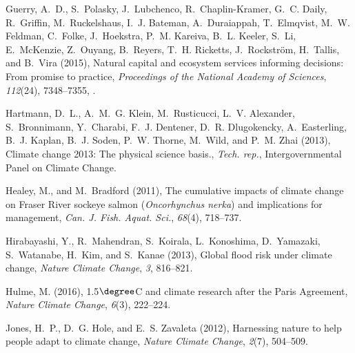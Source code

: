 \documentclass[9pt,twocolumn,twoside,lineno]{pnas-new}
\begin{document}
{{
Guerry, A.~D., S.~Polasky, J.~Lubchenco, R.~Chaplin-Kramer, G.~C. Daily,
  R.~Griffin, M.~Ruckelshaus, I.~J. Bateman, A.~Duraiappah, T.~Elmqvist, M.~W.
  Feldman, C.~Folke, J.~Hoekstra, P.~M. Kareiva, B.~L. Keeler, S.~Li,
  E.~McKenzie, Z.~Ouyang, B.~Reyers, T.~H. Ricketts, J.~Rockstr{\"o}m,
  H.~Tallis, and B.~Vira (2015), Natural capital and ecosystem services
  informing decisions: From promise to practice, \textit{Proceedings of the
  National Academy of Sciences}, \textit{112}(24), 7348--7355,
  .

Hartmann, D.~L., A.~M.~G. Klein, M.~Rusticucci, L.~V. Alexander, S.~Bronnimann,
  Y.~Charabi, F.~J. Dentener, D.~R. Dlugokencky, A.~Easterling, B.~J. Kaplan,
  B.~J. Soden, P.~W. Thorne, M.~Wild, and P.~M. Zhai (2013), Climate change
  2013: The physical science basis., \textit{Tech. rep.}, Intergovernmental
  Panel on Climate Change.

Healey, M., and M.~Bradford (2011), The cumulative impacts of climate change on
  {F}raser {R}iver sockeye salmon (\textit{{O}ncorhynchus nerka}) and
  implications for management, \textit{Can. J. Fish. Aquat. Sci.},
  \textit{68}(4), 718--737.

Hirabayashi, Y., R.~Mahendran, S.~Koirala, L.~Konoshima, D.~Yamazaki,
  S.~Watanabe, H.~Kim, and S.~Kanae (2013), Global flood risk under climate
  change, \textit{Nature Climate Change}, \textit{3}, 816--821.

Hulme, M. (2016), 1.5$\degree${C} and climate research after the {P}aris
  {A}greement, \textit{Nature Climate Change}, \textit{6}(3), 222--224.

Jones, H.~P., D.~G. Hole, and E.~S. Zavaleta (2012), Harnessing nature to help
  people adapt to climate change, \textit{Nature Climate Change},
  \textit{2}(7), 504--509.

}}
\end{document}

